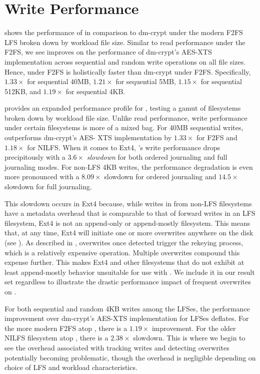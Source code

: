 \section{\SYSTEM{} Write Performance}

 shows the performance of \SYSTEM{} in comparison to
dm-crypt under the modern F2FS LFS broken down by workload file size. Similar to
read performance under the F2FS, we see \SYSTEM{} improves on the performance of
dm-crypt's AES-XTS implementation across sequential and random write operations
on all file sizes. Hence, \SYSTEM{} under F2FS is holistically faster than
dm-crypt under F2FS. Specifically, $1.33\times$ for sequential 40MB, $1.21\times$
for sequential 5MB, $1.15\times$ for sequential 512KB, and $1.19\times$ for
sequential 4KB.

 provides an expanded performance profile for
\SYSTEM{}, testing a gamut of filesystems broken down by workload file size.
Unlike read performance, write performance under certain filesystems is more of
a mixed bag. For 40MB sequential writes, \SYSTEM{} outperforms dm-crypt's AES-
XTS implementation by $1.33\times$ for F2FS and $1.18\times$ for NILFS. When it
comes to Ext4, \SYSTEM{}'s write performance drops precipitously with a
$3.6\times$ \textit{slowdown} for both ordered journaling and full journaling
modes. For non-LFS 4KB writes, the performance degradation is even more
pronounced with a $8.09\times$ slowdown for ordered journaling and $14.5\times$
slowdown for full journaling.

This slowdown occurs in Ext4 because, while writes in \SYSTEM{} from non-LFS
filesystems have a metadata overhead that is comparable to that of forward
writes in an LFS filesystem, Ext4 is not an append-only or append-mostly
filesystem. This means that, at any time, Ext4 will initiate one or more
overwrites anywhere on the disk (see ). As described in
, overwrites once detected trigger the rekeying process, which is
a relatively expensive operation. Multiple overwrites compound this expense
further. This makes Ext4 and other filesystems that do not exhibit at least
append-mostly behavior unsuitable for use with \SYSTEM{}. We include it in our
result set regardless to illustrate the drastic performance impact of frequent
overwrites on \SYSTEM{}.

For both sequential and random 4KB writes among the LFSes, the performance
improvement over dm-crypt's AES-XTS implementation for LFSes deflates. For
the more modern F2FS atop \SYSTEM{}, there is a $1.19\times$ improvement. For
the older NILFS filesystem atop \SYSTEM{}, there is a $2.38\times$ slowdown.
This is where we begin to see the overhead associated with tracking writes and
detecting overwrites potentially becoming problematic, though the overhead is
negligible depending on choice of LFS and workload characteristics.

